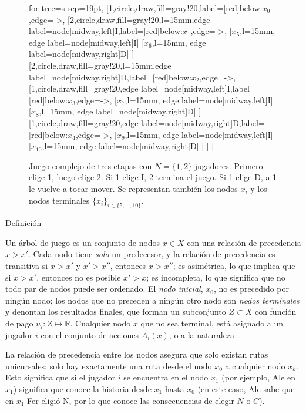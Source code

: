 \documentclass[12pt]{scrartcl}
\begin{document}
\begin{figure}[H]
	\centering
	\footnotesize{
		\begin{forest} for tree={s sep=19pt}, 
			[1,circle,draw,fill=gray!20,label={[red]below:$x_0$},edge={->},
				[2,circle,draw,fill=gray!20,l=15mm,edge label={node[midway,left]{I}},label={[red]below:$x_1$},edge={->},
					[{$x_5$},l=15mm, edge label={node[midway,left]{I}}]
					[{$x_6$},l=15mm, edge label={node[midway,right]{D}}]
				]
				[2,circle,draw,fill=gray!20,l=15mm,edge label={node[midway,right]{D}},label={[red]below:$x_2$},edge={->},
					[1,circle,draw,fill=gray!20,edge label={node[midway,left]{I}},label={[red]below:$x_3$},edge={->},
						[{$x_7$},l=15mm, edge label={node[midway,left]{I}}]
						[{$x_8$},l=15mm, edge label={node[midway,right]{D}}]
					]
					[1,circle,draw,fill=gray!20,edge label={node[midway,right]{D}},label={[red]below:$x_4$},edge={->},
						[{$x_9$},l=15mm, edge label={node[midway,left]{I}}]
						[{$x_{10}$},l=15mm, edge label={node[midway,right]{D}}]
					]
				]
			]
		\end{forest}}
	\caption{Juego complejo de tres etapas con $N=\{1, 2\}$ jugadores. Primero elige 1, luego elige 2. Si 1 elige I, 2 termina el juego. Si 1 elige D, a 1 le vuelve a tocar mover. Se representan también los nodos $x_i$ y los nodos terminales $\{x_{i}\}_{i\in \{5, ..., 10\}}$.}
	\label{fig:fig2}
\end{figure}

\begin{mybox}{Definición}
	\begin{defi}
		Un árbol de juego es un conjunto de nodos $x \in X$ con una relación de precedencia $x > x'$. Cada nodo tiene \textit{solo} un predecesor, y la relación de precedencia es transitiva si $x > x'$ y $x' > x''$, entonces $x > x''$;
		es asimétrica, lo que implica que si $x>x'$, entonces no es posible $x'>x$; es incompleta, lo que significa que no todo par de nodos puede ser ordenado. El \textit{nodo inicial}, $x_0$, no es precedido por ningún nodo; los nodos que no preceden a ningún otro nodo son \textit{nodos terminales} y denontan los resultados finales, que forman un subconjunto $Z \subset X$ con función de pago $u_i\colon Z \mapsto \mathbb{R}$. Cualquier nodo $x$ que no sea terminal, está asignado a un jugador $i$ con el conjunto de acciones $A_i(x)$, o a la naturaleza .
	\end{defi}
	\label{def:def1}
\end{mybox}

La relación de precedencia entre los nodos asegura que solo existan rutas unicursales: solo hay exactamente una ruta desde el nodo $x_0$ a cualquier nodo $x_k$. Esto significa que si el jugador $i$ se encuentra en el nodo $x_1$ (por ejemplo, Ale en $x_1$) significa que conoce la historia desde $x_1$ hasta $x_0$ (en este caso, Ale sabe que en $x_1$ Fer eligió N, por lo que conoce las consecuencias de elegir $N$ o $C$). 
\end{document}
